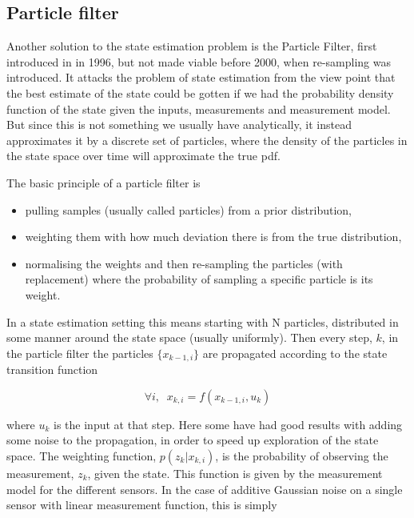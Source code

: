 \subsection{Particle filter}
Another solution to the state estimation problem is the Particle Filter, first introduced in \cite{ParticleFilter} in 1996, but not made viable before 2000, when re-sampling was introduced\cite{ParticleResampling}. It attacks the problem of state estimation from the view point that the best estimate of the state could be gotten if we had the probability density function of the state given the inputs, measurements and measurement model. But since this is not something we usually have analytically, it instead approximates it by a discrete set of particles, where the density of the particles in the state space over time will approximate the true pdf. 

The basic principle of a particle filter is 

\begin{itemize}
    \item pulling samples (usually called particles) from a prior distribution, 
    \item weighting them with how much deviation there is from the true distribution, 
    \item normalising the weights and then re-sampling the particles (with replacement) where the probability of sampling a specific particle is its weight. 
\end{itemize}

In a state estimation setting this means starting with N particles, distributed in some manner around the state space (usually uniformly). Then every step, $k$, in the particle filter the particles $\{x_{k-1,i}\}$ are propagated according to the state transition function

\begin{equation}
\forall i, \; \; x_{k,i} = f(x_{k-1,i}, u_k)
\end{equation}

where $u_k$ is the input at that step. Here some have had good results with adding some noise to the propagation, in order to speed up exploration of the state space\cite{ParticleNoise}. The weighting function, $p(z_k|x_{k,i})$, is the probability of observing the measurement, $z_k$, given the state. This function is given by the measurement model for the different sensors. In the case of additive Gaussian noise on a single sensor with linear measurement function, this is simply

